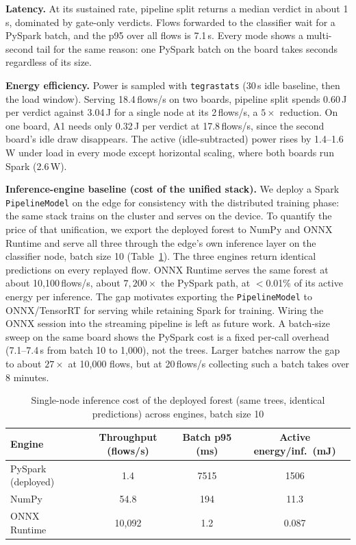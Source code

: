 \documentclass[runningheads]{llncs}
\begin{document}
\textbf{Latency.} At its sustained rate, pipeline split returns a median verdict in about 1\,s, dominated by gate-only verdicts. Flows forwarded to the classifier wait for a PySpark batch, and the p95 over all flows is 7.1\,s. Every mode shows a multi-second tail for the same reason: one PySpark batch on the board takes seconds regardless of its size.

\textbf{Energy efficiency.} Power is sampled with \texttt{tegrastats} (30\,s idle baseline, then the load window). Serving 18.4\,flows/s on two boards, pipeline split spends 0.60\,J per verdict against 3.04\,J for a single node at its 2\,flows/s, a $5\times$ reduction. On one board, A1 needs only 0.32\,J per verdict at 17.8\,flows/s, since the second board's idle draw disappears. The active (idle-subtracted) power rises by 1.4--1.6\,W under load in every mode except horizontal scaling, where both boards run Spark (2.6\,W).

\textbf{Inference-engine baseline (cost of the unified stack).} We deploy a Spark \texttt{PipelineModel} on the edge for consistency with the distributed training phase: the same stack trains on the cluster and serves on the device. To quantify the price of that unification, we export the deployed forest to NumPy and ONNX Runtime and serve all three through the edge's own inference layer on the classifier node, batch size 10 (Table~\ref{tab:engines}). The three engines return identical predictions on every replayed flow. ONNX Runtime serves the same forest at about 10{,}100\,flows/s, about $7{,}200\times$ the PySpark path, at $<$0.01\% of its active energy per inference. The gap motivates exporting the \texttt{PipelineModel} to ONNX/TensorRT for serving while retaining Spark for training. Wiring the ONNX session into the streaming pipeline is left as future work. A batch-size sweep on the same board shows the PySpark cost is a fixed per-call overhead (7.1--7.4\,s from batch 10 to 1{,}000), not the trees. Larger batches narrow the gap to about $27\times$ at 10{,}000 flows, but at 20\,flows/s collecting such a batch takes over 8 minutes.

\begin{table}[htbp]
  \caption{Single-node inference cost of the deployed forest (same trees, identical predictions) across engines, batch size 10}
  \label{tab:engines}
  \centering
  \small
  \begin{tabular}{l c c c}
    \toprule
    Engine & Throughput (flows/s) & Batch p95 (ms) & Active energy/inf.\ (mJ) \\
    \midrule
    PySpark (deployed) & 1.4 & 7515 & 1506 \\
    NumPy              & 54.8 & 194 & 11.3 \\
    ONNX Runtime       & 10{,}092 & 1.2 & 0.087 \\
    \bottomrule
  \end{tabular}
\end{table}
\end{document}
